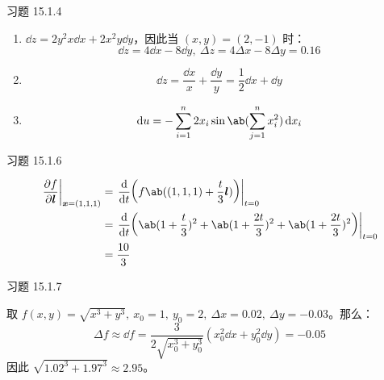 \begin{problem}
    习题 15.1.4
    \begin{solution}
        \begin{enumerate}
            \item[\textbf{1)}] $\dd{z} = 2 y^2 x \dd{x} + 2 x^2 y \dd{y}$，因此当 $(x, y) = (2, -1)$ 时：
            $$
            \dd{z} = 4 \dd{x} - 8 \dd{y},\ \Delta z = 4 \Delta x - 8 \Delta y = 0.16
            $$
            \item[\textbf{2)}]
            $$
            \dd{z} = \frac{\dd{x}}{x} + \frac{\dd{y}}{y} = \frac{1}{2} \dd{x} + \dd{y}
            $$
            \item[\textbf{3)}]
            $$
            \dd{u} = -\sum_{i = 1}^{n} 2 x_i \sin \ab(\sum_{j = 1}^{n} x_i^2) \dd{x_i}
            $$
        \end{enumerate}
    \end{solution}
\end{problem}

\begin{problem}
    习题 15.1.6
    \begin{solution}
        $$
        \begin{aligned}
            \left. \pdv{f}{\vect{l}} \right|_{\vect{x} = (1, 1, 1)} & = \left. \dv{t}(f\ab((1, 1, 1) + \frac{t}{3} \vect{l})) \right|_{t = 0} \\
            & = \left. \dv{t}(\ab(1 + \frac{t}{3})^2 + \ab(1 + \frac{2t}{3})^2 + \ab(1 + \frac{2t}{3})^2) \right|_{t = 0} \\
            & = \frac{10}{3}
        \end{aligned}
        $$
    \end{solution}
\end{problem}

\begin{problem}
    习题 15.1.7
    \begin{solution}
        取 $f(x, y) = \sqrt{x^3 + y^3},\ x_0 = 1,\ y_0 = 2,\ \Delta x = 0.02,\ \Delta y = -0.03$。那么：
        $$
        \Delta f \approx \dd{f} = \frac{3}{2 \sqrt{x_0^3 + y_0^3}} (x_0^2 \dd{x} + y_0^2 \dd{y}) = -0.05
        $$
        因此 $\sqrt{1.02^3 + 1.97^3} \approx 2.95$。
    \end{solution}
\end{problem}

